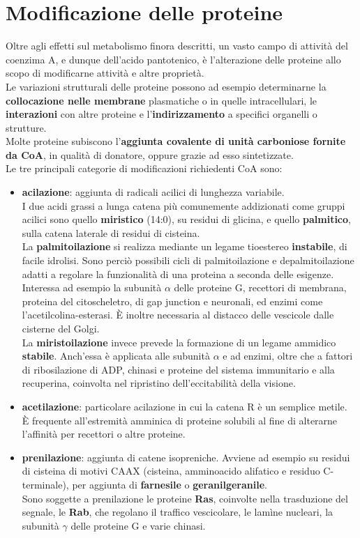 \documentclass[a4paper, 12pt]{article}
\begin{document}
\section{Modificazione delle proteine}
Oltre agli effetti sul metabolismo finora descritti, un vasto campo di attività del coenzima A, e dunque dell'acido pantotenico, è l'alterazione delle proteine allo scopo di modificarne attività e altre proprietà.\\
Le variazioni strutturali delle proteine possono ad esempio determinarne la \textbf{collocazione nelle membrane} plasmatiche o in quelle intracellulari, le \textbf{interazioni} con altre proteine e l'\textbf{indirizzamento} a specifici organelli o strutture.\\
Molte proteine subiscono l'\textbf{aggiunta covalente di unità carboniose fornite da CoA}, in qualità di donatore, oppure grazie ad esso sintetizzate.\\
Le tre principali categorie di modificazioni richiedenti CoA sono:
\begin{itemize}
\item \textbf{acilazione}: aggiunta di radicali acilici di lunghezza variabile.\\ I due acidi grassi a lunga catena più comunemente addizionati come gruppi acilici sono quello \textbf{miristico} (14:0), su residui di glicina, e quello \textbf{palmitico}, sulla catena laterale di residui di cisteina.\\
La \textbf{palmitoilazione} si realizza mediante un legame tioestereo \textbf{instabile}, di facile idrolisi. Sono perciò possibili cicli di palmitoilazione e depalmitoilazione adatti a regolare la funzionalità di una proteina a seconda delle esigenze. Interessa ad esempio la subunità $\alpha$ delle proteine G, recettori di membrana, proteina del citoscheletro, di gap junction e neuronali, ed enzimi come l'acetilcolina-esterasi. È inoltre necessaria al distacco delle vescicole dalle cisterne del Golgi.\\
La \textbf{miristoilazione} invece prevede la formazione di un legame ammidico \textbf{stabile}. Anch'essa è applicata alle subunità $\alpha$ e ad enzimi, oltre che a fattori di ribosilazione di ADP, chinasi e proteine del sistema immunitario e alla recuperina, coinvolta nel ripristino dell'eccitabilità della visione.
\item \textbf{acetilazione}: particolare acilazione in cui la catena R è un semplice metile.\\ È frequente all'estremità amminica di proteine solubili al fine di alterarne l'affinità per recettori o altre proteine.
\item \textbf{prenilazione}: aggiunta di catene isopreniche.
Avviene ad esempio su residui di cisteina di motivi CAAX (cisteina, amminoacido alifatico e residuo C-terminale), per aggiunta di \textbf{farnesile} o \textbf{geranilgeranile}.\\
Sono soggette a prenilazione le proteine \textbf{Ras}, coinvolte nella trasduzione del segnale, le \textbf{Rab}, che regolano il traffico vescicolare, le lamìne nucleari, la subunità $\gamma$ delle proteine G e varie chinasi.
\end{itemize}
\end{document}
